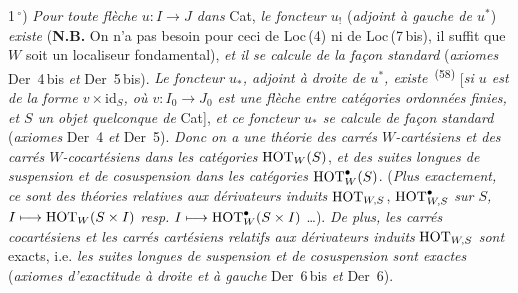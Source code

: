 1\,$^{\circ}$) \textit{Pour toute flèche $u : I \longrightarrow J$ dans} Cat, \textit{le foncteur $u_!$} (\textit{adjoint à gauche de $u^*$}) \textit{existe} (\textbf{N.B.} On n'a pas besoin pour ceci de Loc\,(4) ni de Loc\,(7\,bis), il suffit que $W$ soit un localiseur fondamental), \textit{et il se calcule de la façon standard} (\textit{axiomes} Der~4\,bis \textit{et} Der~5\,bis). \textit{Le foncteur $u_*$, adjoint à droite de $u^*$, existe}~\textsuperscript{(58)} [\textit{si $u$ est de la forme $v \times \mathrm{id}_S$, où $v : I_0 \longrightarrow J_0$ est une flèche entre catégories ordonnées finies, et $S$ un objet quelconque de} Cat], \textit{et ce foncteur $u_*$ se calcule de façon standard} (\textit{axiomes} Der~4 \textit{et} Der~5). \textit{Donc on a une théorie des carrés $W$-cartésiens et des carrés $W$-cocartésiens dans les catégories} $\mathrm{HOT}_W(S)$, \textit{et des suites}
\textit{longues de suspension et de cosuspension dans les catégories} $\mathrm{HOT}^{\bullet}_W(S)$. (\textit{Plus exactement, ce sont des théories relatives aux dérivateurs induits} $\mathrm{HOT}_{W,S}$, $\mathrm{HOT}^{\bullet}_{W,S}$ \textit{sur $S$,} $I \longmapsto \mathrm{HOT}_W(S \times I)$ \textit{resp.} $I \longmapsto \mathrm{HOT}^{\bullet}_W(S \times I)$ \ldots). \textit{De plus, les carrés cocartésiens et les carrés cartésiens relatifs aux dérivateurs induits} $\mathrm{HOT}_{W,S}$ \textit{sont} exacts, i.e. \textit{les suites longues de suspension et de cosuspension sont exactes} (\textit{axiomes d'exactitude à droite et à gauche} Der~6\,bis \textit{et} Der~6).

